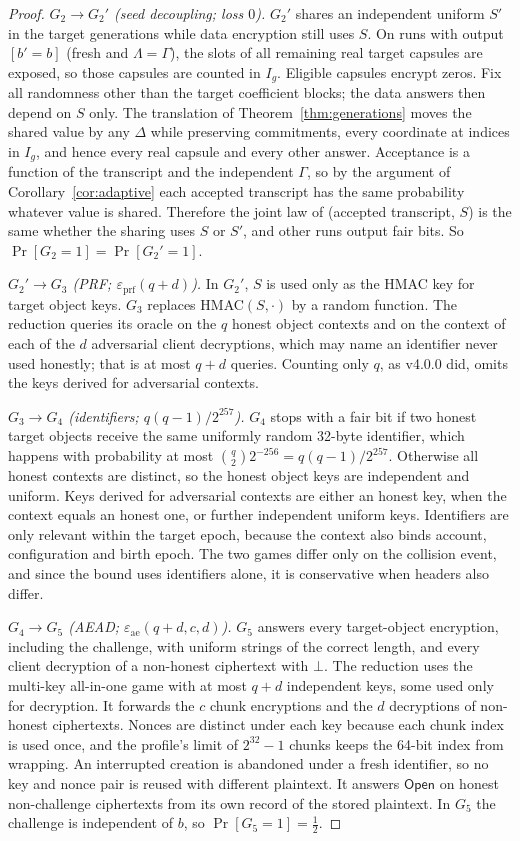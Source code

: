 \documentclass[pdflatex,sn-mathphys-num]{sn-jnl}
\theoremstyle{plain}
\theoremstyle{definition}
\begin{document}
\begin{proof}
\emph{$G_2\to G_2'$ (seed decoupling; loss $0$).} $G_2'$ shares an independent uniform $S'$ in the target generations while data encryption still uses $S$. On runs with output $[b'=b]$ (fresh and $\Lambda=\Gamma$), the slots of all remaining real target capsules are exposed, so those capsules are counted in $I_g$. Eligible capsules encrypt zeros. Fix all randomness other than the target coefficient blocks; the data answers then depend on $S$ only. The translation of Theorem~\ref{thm:generations} moves the shared value by any $\Delta$ while preserving commitments, every coordinate at indices in $I_g$, and hence every real capsule and every other answer. Acceptance is a function of the transcript and the independent $\Gamma$, so by the argument of Corollary~\ref{cor:adaptive} each accepted transcript has the same probability whatever value is shared. Therefore the joint law of (accepted transcript, $S$) is the same whether the sharing uses $S$ or $S'$, and other runs output fair bits. So $\Pr[G_2=1]=\Pr[G_2'=1]$.

\emph{$G_2'\to G_3$ (PRF; $\varepsilon_{\mathrm{prf}}(q+d)$).} In $G_2'$, $S$ is used only as the HMAC key for target object keys. $G_3$ replaces HMAC$(S,\cdot)$ by a random function. The reduction queries its oracle on the $q$ honest object contexts and on the context of each of the $d$ adversarial client decryptions, which may name an identifier never used honestly; that is at most $q+d$ queries. Counting only $q$, as v4.0.0 did, omits the keys derived for adversarial contexts.

\emph{$G_3\to G_4$ (identifiers; $q(q-1)/2^{257}$).} $G_4$ stops with a fair bit if two honest target objects receive the same uniformly random 32-byte identifier, which happens with probability at most $\binom q2 2^{-256}=q(q-1)/2^{257}$. Otherwise all honest contexts are distinct, so the honest object keys are independent and uniform. Keys derived for adversarial contexts are either an honest key, when the context equals an honest one, or further independent uniform keys. Identifiers are only relevant within the target epoch, because the context also binds account, configuration and birth epoch. The two games differ only on the collision event, and since the bound uses identifiers alone, it is conservative when headers also differ.

\emph{$G_4\to G_5$ (AEAD; $\varepsilon_{\mathrm{ae}}(q+d,c,d)$).} $G_5$ answers every target-object encryption, including the challenge, with uniform strings of the correct length, and every client decryption of a non-honest ciphertext with $\bot$. The reduction uses the multi-key all-in-one game with at most $q+d$ independent keys, some used only for decryption. It forwards the $c$ chunk encryptions and the $d$ decryptions of non-honest ciphertexts. Nonces are distinct under each key because each chunk index is used once, and the profile's limit of $2^{32}-1$ chunks keeps the 64-bit index from wrapping. An interrupted creation is abandoned under a fresh identifier, so no key and nonce pair is reused with different plaintext. It answers $\mathsf{Open}$ on honest non-challenge ciphertexts from its own record of the stored plaintext. In $G_5$ the challenge is independent of $b$, so $\Pr[G_5=1]=\tfrac12$.


\end{proof}
\end{document}
